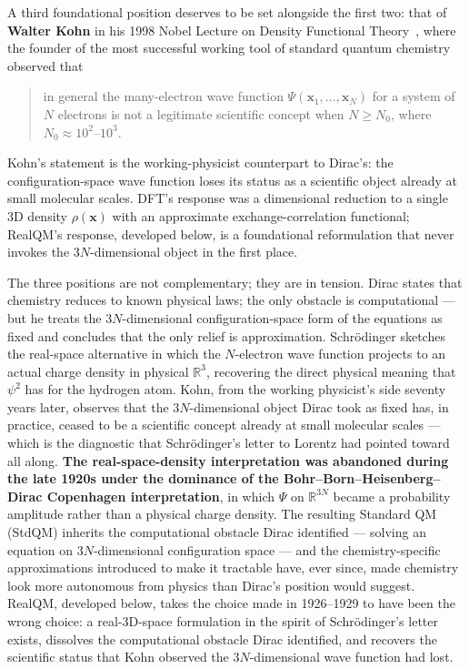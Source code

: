 \documentclass[11pt]{article}
\begin{document}
A third foundational position deserves to be set alongside the first two: that of \textbf{Walter Kohn} in his 1998 Nobel Lecture on Density Functional Theory~\cite{Kohn1998Nobel}, where the founder of the most successful working tool of standard quantum chemistry observed that
\begin{quote}
in general the many-electron wave function $\Psi(\mathbf{x}_1, \ldots, \mathbf{x}_N)$ for a system of $N$ electrons is not a legitimate scientific concept when $N \geq N_0$, where $N_0 \approx 10^2$--$10^3$.
\end{quote}
Kohn's statement is the working-physicist counterpart to Dirac's: the configuration-space wave function loses its status as a scientific object already at small molecular scales. DFT's response was a dimensional reduction to a single 3D density $\rho(\mathbf{x})$ with an approximate exchange-correlation functional; RealQM's response, developed below, is a foundational reformulation that never invokes the $3N$-dimensional object in the first place.

The three positions are not complementary; they are in tension. Dirac states that chemistry reduces to known physical laws; the only obstacle is computational --- but he treats the $3N$-dimensional configuration-space form of the equations as fixed and concludes that the only relief is approximation. Schr\"odinger sketches the real-space alternative in which the $N$-electron wave function projects to an actual charge density in physical $\mathbb{R}^3$, recovering the direct physical meaning that $\psi^2$ has for the hydrogen atom. Kohn, from the working physicist's side seventy years later, observes that the $3N$-dimensional object Dirac took as fixed has, in practice, ceased to be a scientific concept already at small molecular scales --- which is the diagnostic that Schr\"odinger's letter to Lorentz had pointed toward all along. \textbf{The real-space-density interpretation was abandoned during the late 1920s under the dominance of the Bohr--Born--Heisenberg--Dirac Copenhagen interpretation}, in which $\Psi$ on $\mathbb{R}^{3N}$ became a probability amplitude rather than a physical charge density. The resulting Standard QM (StdQM) inherits the computational obstacle Dirac identified --- solving an equation on $3N$-dimensional configuration space --- and the chemistry-specific approximations introduced to make it tractable have, ever since, made chemistry look more autonomous from physics than Dirac's position would suggest. RealQM, developed below, takes the choice made in 1926--1929 to have been the wrong choice: a real-3D-space formulation in the spirit of Schr\"odinger's letter exists, dissolves the computational obstacle Dirac identified, and recovers the scientific status that Kohn observed the $3N$-dimensional wave function had lost.
\end{document}
